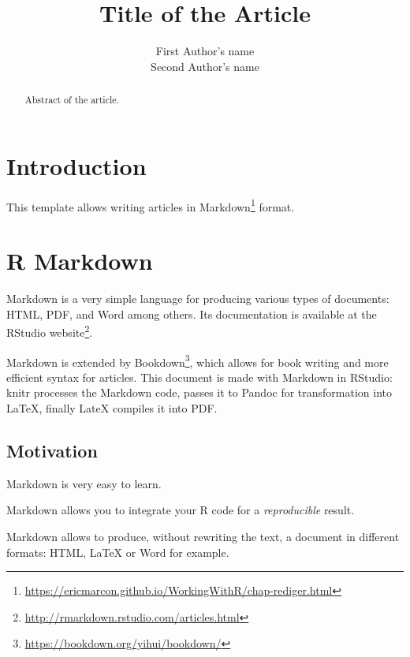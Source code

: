 \documentclass[fleqn,]{article} %
\title{Title of the Article} %
\author{
First Author's name\\ Second Author's name
} %
\begin{document}

\maketitle %

\begin{abstract}
Abstract of the article.
\end{abstract}


\thispagestyle{empty} %


\section{Introduction}\label{introduction}

This template allows writing articles in Markdown\footnote{\url{https://ericmarcon.github.io/WorkingWithR/chap-rediger.html}} format.

\section{R Markdown}\label{markdown}

Markdown is a very simple language for producing various types of documents: HTML, PDF, and Word among others.
Its documentation is available at the RStudio website\footnote{\url{http://rmarkdown.rstudio.com/articles.html}}.

Markdown is extended by Bookdown\footnote{\url{https://bookdown.org/yihui/bookdown/}}, which allows for book writing and more efficient syntax for articles.
This document is made with Markdown in RStudio: knitr processes the Markdown code, passes it to Pandoc for transformation into LaTeX, finally LateX compiles it into PDF.

\subsection{Motivation}\label{motivation}

Markdown is very easy to learn.

Markdown allows you to integrate your R code for a \emph{reproducible} result.

Markdown allows to produce, without rewriting the text, a document in different formats: HTML, LaTeX or Word for example.
\end{document}
